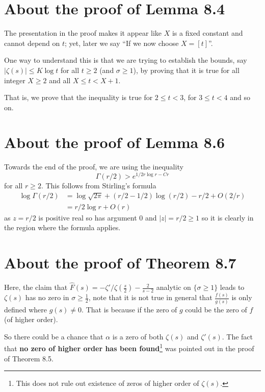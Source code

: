 \documentclass[12pt]{article}
\newcommand{\Fhat}{\widehat{F}}
\begin{document}
\fi

\section{About the proof of Lemma 8.4}

The presentation in the proof makes it appear like $X$ is a fixed constant and cannot depend on $t$; yet, later we say ``If we now choose $X = [t]$''.

One way to understand this is that we are trying to establish the bounds, say $|\zeta(s)| \leq K \log t$ for all $t \geq 2$ (and $\sigma \geq 1$), by proving that it is true for all integer $X \geq 2$ and all $X \leq t < X + 1$. 

That is, we prove that the inequality is true for $2 \leq t < 3$, for $3 \leq t < 4$ and so on.

\section{About the proof of Lemma 8.6}

Towards the end of the proof, we are using the inequality
$$\Gamma(r/2) > e^{1/2 r \log r - Cr}$$
for all $r \geq 2$. This follows from Stirling's formula
\begin{align*}
\log \Gamma(r/2) &= \log \sqrt{2\pi} + (r/2 - 1/2) \log (r/2) - r/2 + O(2/r) \\
&= r/2 \log r + O(r)
\end{align*}
as $z = r/2$ is positive real so has argument 0 and $|z| = r/2 \geq 1$ so it is clearly in the region where the formula applies.

\section{About the proof of Theorem 8.7}

Here, the claim that $\Fhat(s) = -\zeta'/\zeta(\frac{s}{2}) - \frac{2}{s-2} $ analytic on $\{\sigma \geq 1\}$ leads to $\zeta(s)$ has no zero in $\sigma \geq \frac12$, note that it is not true in general that $\frac{f(s)}{g(s)}$ is only defined where $g(s) \not= 0$. That is because if the zero of $g$ could be the zero of $f$ (of higher order).

So there could be a chance that $\alpha$ is a zero of both $\zeta(s)$ and $\zeta'(s)$. The fact that \textbf{no zero of higher order has been found}\footnote{This does not rule out existence of zeros of higher order of $\zeta(s)$.} was pointed out in the proof of Theorem 8.5.
\end{document}

